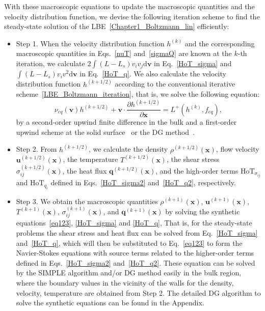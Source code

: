 With these macroscopic equations to update the macroscopic quantities and the velocity distribution function, we devise the following  iteration scheme to find the steady-state solution of the LBE~\eqref{Chapter1_Boltzmann_lin} efficiently:
\begin{itemize}
	
	\item Step 1. When the velocity distribution function $h^{(k)}$ and the corresponding macroscopic quantities in Eqs.~\eqref{nuT} and~\eqref{sigmaQ} are known at the $k$-th iteration, we calculate $2\int{(L-L_s)v_iv_j}\mathrm{d}\bm{v}$ in Eq.~\eqref{HoT_sigma} and $\int{(L-L_s)v_iv^2}\mathrm{d}\bm{v}$ in Eq.~\eqref{HoT_q}. We also calculate the velocity distribution function $h^{(k+1/2)}$ according to the conventional iterative scheme~\eqref{LBE_Boltzmann_iteration}, that is, we solve the following equation:
	\begin{equation}\label{syn_LBE0}
	\nu_{eq}(\bm{v})h^{(k+1/2)}+\bm{v}\cdot\frac{\partial
		{h}^{(k+1/2)}}{\partial{\bm{x}}}=L^+(h^{(k)},f_{eq}),
	\end{equation}
	by a second-order upwind finite difference in the bulk and a first-order upwind scheme at the solid surface~\cite{ohwada1989numerical} or the DG method~\cite{WeiSuJCP1,Su2019IDG}.
	
	
	\item Step 2. From $h^{(k+1/2)}$, we calculate the density $\rho^{(k+1/2)}(\bm{x})$, flow velocity $\bm{u}^{(k+1/2)}(\bm{x})$, the temperature $T^{(k+1/2)}(\bm{x})$, the shear stress $\sigma_{ij}^{(k+1/2)}(\bm{x})$, the heat flux $\bm{q}^{(k+1/2)}(\bm{x})$, and the high-order terms $\text{HoT}_{\sigma_{ij}}$ and $\text{HoT}_{q_i}$ defined in Eqs.~\eqref{HoT_sigma2} and~\eqref{HoT_q2}, respectively.
	
	
	\item Step 3. We obtain the macroscopic quantities $\rho^{(k+1)}(\bm{x})$,  $\bm{u}^{(k+1)}(\bm{x})$, $T^{(k+1)}(\bm{x})$, $\sigma_{ij}^{(k+1)}(\bm{x})$, and $\bm{q}^{(k+1)}(\bm{x})$ by solving the synthetic equations~\eqref{eq123}, \eqref{HoT_sigma} and \eqref{HoT_q}, That is, for the steady-state problems the shear stress and heat flux can be solved from Eq.~\eqref{HoT_sigma} and~\eqref{HoT_q}, which will then be substituted to Eq.~\eqref{eq123} to form the Navier-Stokes equations with source terms related to the higher-order terms defined in Eqs.~\eqref{HoT_sigma2} and~\eqref{HoT_q2}. These equation can be solved by the SIMPLE algorithm and/or DG method easily in the bulk region, where the boundary values in the vicinity of the walls for the density, velocity, temperature are obtained from Step 2. The detailed DG algorithm to solve the synthetic equations can be found in the Appendix.
	

\end{itemize}
